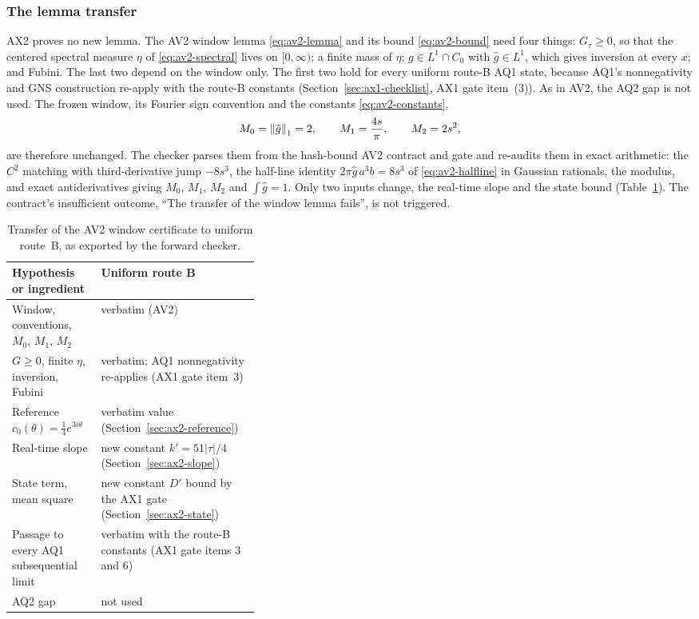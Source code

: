 \subsubsection{The lemma transfer}
\label{sec:ax2-transfer}
AX2 proves no new lemma. The AV2 window lemma \eqref{eq:av2-lemma} and its
bound \eqref{eq:av2-bound} need four things: $G_\tau\ge0$, so that the
centered spectral measure $\eta$ of \eqref{eq:av2-spectral} lives on
$[0,\infty)$; a finite mass of $\eta$; $g\in L^1\cap C_0$ with
$\hat g\in L^1$, which gives inversion at every $x$; and Fubini. The last two
depend on the window only. The first two hold for every uniform route-B AQ1
state, because AQ1's nonnegativity and GNS construction re-apply with the
route-B constants (Section~\ref{sec:ax1-checklist}, AX1 gate item~(3)). As in
AV2, the AQ2 gap is not used. The frozen window, its Fourier sign convention
and the constants \eqref{eq:av2-constants},
\[
 M_0=\left\lVert\hat g\right\rVert_1=2,\qquad M_1=\frac{4s}{\pi},\qquad M_2=2s^2,
\]
are therefore unchanged. The checker parses them from the hash-bound AV2
contract and gate and re-audits them in exact arithmetic: the $C^2$ matching
with third-derivative jump $-8s^3$, the half-line identity
$2\pi\hat g\,a^3b=8s^3$ of \eqref{eq:av2-halfline} in Gaussian rationals, the
modulus, and exact antiderivatives giving $M_0$, $M_1$, $M_2$ and
$\int\hat g=1$. Only two inputs change, the real-time slope and the state
bound (Table~\ref{tab:ax2-transfer}). The contract's insufficient outcome,
``The transfer of the window lemma fails'', is not triggered.

\begin{table}[htbp]
\centering\small
\caption{Transfer of the AV2 window certificate to uniform route~B, as
exported by the forward checker.}
\label{tab:ax2-transfer}
\begin{tabularx}{\linewidth}{@{}>{\raggedright\arraybackslash}p{0.36\linewidth}
 >{\raggedright\arraybackslash}X@{}}
\toprule
Hypothesis or ingredient & Uniform route B\\
\midrule
Window, conventions, $M_0$, $M_1$, $M_2$ & verbatim (AV2)\\
$G\ge0$, finite $\eta$, inversion, Fubini & verbatim; AQ1 nonnegativity
re-applies (AX1 gate item~3)\\
Reference $c_0(\theta)=\tfrac14e^{3i\theta}$ & verbatim value
(Section~\ref{sec:ax2-reference})\\
Real-time slope & new constant $k'=51|\tau|/4$
(Section~\ref{sec:ax2-slope})\\
State term, mean square & new constant $D'$ bound by the AX1 gate
(Section~\ref{sec:ax2-state})\\
Passage to every AQ1 subsequential limit & verbatim with the route-B
constants (AX1 gate items 3 and 6)\\
AQ2 gap & not used\\
\bottomrule
\end{tabularx}
\end{table}

